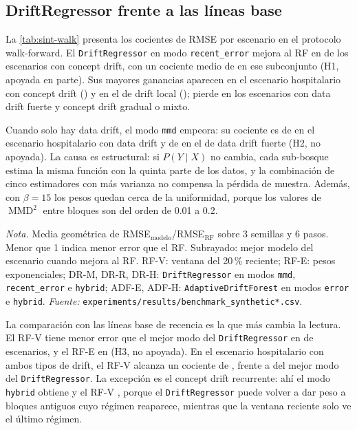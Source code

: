 \documentclass[11pt,a4paper]{article}
\newcommand{\MMD}{\operatorname{MMD}}
\newcommand{\nota}[1]{\par\smallskip\raggedright\footnotesize\textit{Nota.} #1}
\begin{document}
\subsection{DriftRegressor frente a las líneas base}\label{sec:res-dr}

La \cref{tab:sint-walk} presenta los cocientes de RMSE por escenario en el protocolo walk-forward. El
\texttt{DriftRegressor} en modo \texttt{recent\_error} mejora al RF en \hUnoGana{} de los \nConcept{}
escenarios con concept drift, con un cociente medio de \hUnoGeo{} en ese subconjunto (H1, apoyada en
parte). Sus mayores ganancias aparecen en el escenario hospitalario con concept drift
(\xDRrHealthcareConceptWalk) y en el de drift local (\xDRrLocalDriftWalk); pierde en los escenarios
con data drift fuerte y concept drift gradual o mixto.

Cuando solo hay data drift, el modo \texttt{mmd} empeora: su cociente es de \hDosMin{} en el escenario
hospitalario con data drift y de \hDosMax{} en el de data drift fuerte (H2, no apoyada). La causa es
estructural: si $P(Y\mid X)$ no cambia, cada sub-bosque estima la misma función con la quinta parte
de los datos, y la combinación de cinco estimadores con más varianza no compensa la pérdida de
muestra. Además, con $\beta=15$ los pesos quedan cerca de la uniformidad, porque los valores de
$\MMD^2$ entre bloques son del orden de 0.01 a 0.2.

\begin{table}[htbp]
  \centering
  \caption{Cociente de RMSE respecto al RF convencional, escenarios sintéticos, walk-forward}\label{tab:sint-walk}
  \small
  
  \nota{Media geométrica de RMSE$_{\text{modelo}}$/RMSE$_{\text{RF}}$ sobre 3 semillas y 6 pasos.
  Menor que 1 indica menor error que el RF. Subrayado: mejor modelo del escenario cuando mejora al RF.
  RF-V: ventana del 20\,\% reciente; RF-E: pesos exponenciales; DR-M, DR-R, DR-H:
  \texttt{DriftRegressor} en modos \texttt{mmd}, \texttt{recent\_error} e \texttt{hybrid}; ADF-E,
  ADF-H: \texttt{AdaptiveDriftForest} en modos \texttt{error} e \texttt{hybrid}. \textit{Fuente:}
  \texttt{experiments/results/benchmark\_synthetic*.csv}.}
\end{table}

La comparación con las líneas base de recencia es la que más cambia la lectura. El RF-V tiene menor
error que el mejor modo del \texttt{DriftRegressor} en \hTresRFV{} de \hTresN{} escenarios, y el RF-E
en \hTresRFE{} (H3, no apoyada). En el escenario hospitalario con ambos tipos de drift, el RF-V
alcanza un cociente de \xRFVHealthcareBothWalk{}, frente a \xDRrHealthcareBothWalk{} del mejor modo
del \texttt{DriftRegressor}. La excepción es el concept drift recurrente: ahí el modo
\texttt{hybrid} obtiene \xDRhFriedmanRecurringWalk{} y el RF-V \xRFVFriedmanRecurringWalk{}, porque
el \texttt{DriftRegressor} puede volver a dar peso a bloques antiguos cuyo régimen reaparece,
mientras que la ventana reciente solo ve el último régimen.
\end{document}
